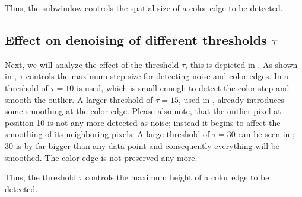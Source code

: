 Thus, the subwindow controls the spatial size of a color edge to be detected.





\subsection{Effect on denoising of different thresholds $\tau$}
\label{ssec:perception_results_threshold}

Next, we will analyze the effect of the threshold $\tau$, this is depicted in . 
As shown in , $\tau$ controls the maximum step size for detecting noise and color edges. 
In  a threshold of $\tau = 10$ is used, which is small enough to detect the color step and smooth the outlier. 
A larger threshold of $\tau = 15$, used in , already introduces some smoothing at the color edge. 
Please also note, that the outlier pixel at position 10 is not any more detected as noise; instead it begins to affect the smoothing of its neighboring pixels. 
A large threshold of $\tau = 30$ can be seen in ; 30 is by far bigger than any data point and consequently everything will be smoothed. 
The color edge is not preserved any more.

Thus, the threshold $\tau$ controls the maximum height of a color edge to be detected.

